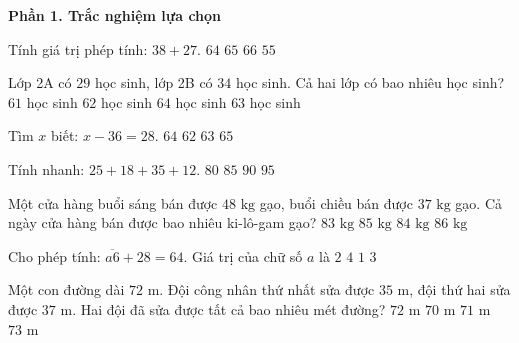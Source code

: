 \textbf{Phần 1. Trắc nghiệm lựa chọn}

\begin{ex} %
Tính giá trị phép tính: $38 + 27$.
\choice
{$64$}
{\True $65$}
{$66$}
{$55$}
\end{ex}

\begin{ex} %
Lớp 2A có $29$ học sinh, lớp 2B có $34$ học sinh. Cả hai lớp có bao nhiêu học sinh?
\choice
{$61$ học sinh}
{$62$ học sinh}
{$64$ học sinh}
{\True $63$ học sinh}
\end{ex}

\begin{ex} %
Tìm $x$ biết: $x - 36 = 28$.
\choice
{\True $64$}
{$62$}
{$63$}
{$65$}
\end{ex}

\begin{ex} %
Tính nhanh: $25 + 18 + 35 + 12$.
\choice
{$80$}
{$85$}
{\True $90$}
{$95$}
\end{ex}

\begin{ex} %
Một cửa hàng buổi sáng bán được $48\text{ kg}$ gạo, buổi chiều bán được $37\text{ kg}$ gạo. Cả ngày cửa hàng bán được bao nhiêu ki-lô-gam gạo?
\choice
{$83\text{ kg}$}
{\True $85\text{ kg}$}
{$84\text{ kg}$}
{$86\text{ kg}$}
\end{ex}

\begin{ex} %
Cho phép tính: $\overline{a6} + 28 = 64$. Giá trị của chữ số $a$ là
\choice
{$2$}
{$4$}
{$1$}
{\True $3$}
\end{ex}

\begin{ex} %
Một con đường dài $72\text{ m}$. Đội công nhân thứ nhất sửa được $35\text{ m}$, đội thứ hai sửa được $37\text{ m}$. Hai đội đã sửa được tất cả bao nhiêu mét đường?
\choice
{\True $72\text{ m}$}
{$70\text{ m}$}
{$71\text{ m}$}
{$73\text{ m}$}
\end{ex}

